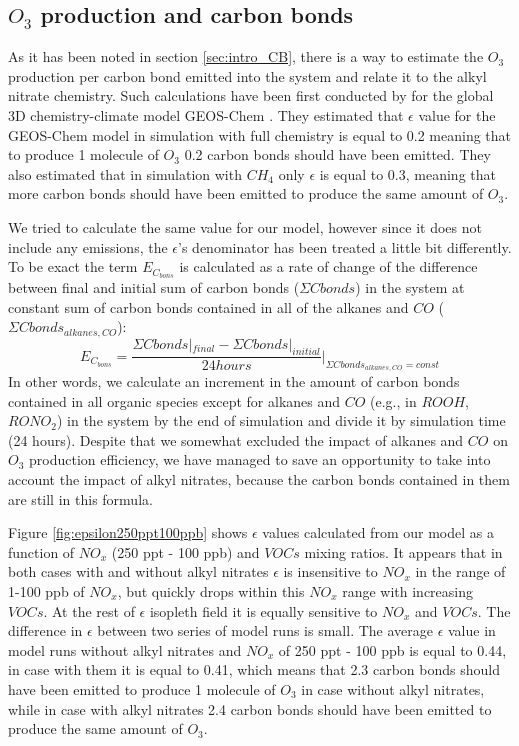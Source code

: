 \documentclass[11pt,a4paper]{article}
\begin{document}
\subsection{$O_3$ production and carbon bonds}\label{sec:res_O3ANCB}

As it has been noted in section \ref{sec:intro_CB}, there is a way to estimate the $O_3$ production per carbon bond emitted into the system and relate it to the alkyl nitrate chemistry. Such calculations have been first conducted by \citep{Evans2014} for the global 3D chemistry-climate model GEOS-Chem \citep{Bey2001}. They estimated that $\epsilon$ value for the GEOS-Chem model in simulation with full chemistry is equal to 0.2 meaning that to produce 1 molecule of $O_3$ 0.2 carbon bonds should have been emitted. They also estimated that in simulation with $CH_4$ only $\epsilon$ is equal to 0.3, meaning that more carbon bonds should have been emitted to produce the same amount of $O_3$.

We tried to calculate the same value for our model, however since it does not include any emissions, the $\epsilon$'s denominator has been treated a little bit differently. To be exact the term $E_{C_{bons}}$ is calculated as a rate of change of the difference between final and initial sum of carbon bonds ($\Sigma Cbonds$) in the system at constant sum of carbon bonds contained in all of the alkanes and $CO$ ($\Sigma Cbonds_{alkanes, CO}$): 
\begin{equation}\label{eq:ECbonds}
E_{C_{bons}} = {\dfrac{\Sigma Cbonds|_{final} - \Sigma Cbonds|_{initial}}{24 hours}}\bigg|_{\Sigma Cbonds_{alkanes, CO} =const}
\end{equation}
In other words, we calculate an increment in the amount of carbon bonds contained in all organic species except for alkanes and $CO$ (e.g., in $ROOH$, $RONO_2$) in the system by the end of simulation and divide it by simulation time (24 hours). Despite that we somewhat excluded the impact of alkanes and $CO$ on $O_3$ production efficiency, we have managed to save an opportunity to take into account the impact of alkyl nitrates, because the carbon bonds contained in them are still in this formula.

Figure \ref{fig:epsilon250ppt100ppb} shows $\epsilon$ values calculated from our model as a function of $NO_x$ (250 ppt - 100 ppb) and $VOCs$ mixing ratios. It appears that in both cases with and without alkyl nitrates $\epsilon$ is insensitive to $NO_x$ in the range of 1-100 ppb of $NO_x$, but quickly drops within this $NO_x$ range with increasing $VOCs$. At the rest of $\epsilon$ isopleth field it is equally sensitive to $NO_x$ and $VOCs$. The difference in $\epsilon$ between two series of model runs is small. The average $\epsilon$ value in model runs without alkyl nitrates and $NO_x$ of 250 ppt - 100 ppb is equal to 0.44, in case with them it is equal to 0.41, which means that 2.3 carbon bonds should have been emitted to produce 1 molecule of $O_3$ in case without alkyl nitrates, while in case with alkyl nitrates 2.4 carbon bonds should have been emitted to produce the same amount of $O_3$.
\end{document}
